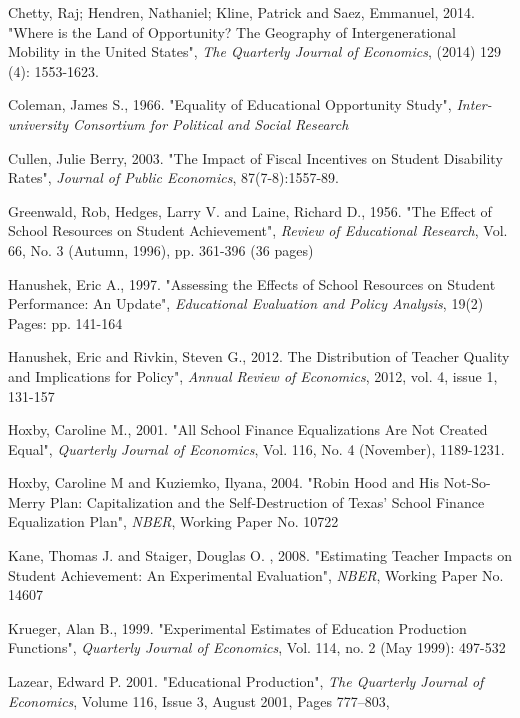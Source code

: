 \documentclass[11pt]{article}
\begin{document}
\begin{thebibliography}{9}

Chetty, Raj; Hendren, Nathaniel;  Kline, Patrick and Saez, Emmanuel, 2014.
"Where is the Land of Opportunity? The Geography of Intergenerational Mobility in the United States",
\textit{The Quarterly Journal of Economics}, (2014) 129 (4): 1553-1623. 

Coleman, James S., 1966.
"Equality of Educational Opportunity Study",
\textit{Inter-university Consortium for Political and Social Research}

Cullen, Julie Berry, 2003. 
"The Impact of Fiscal Incentives on Student Disability Rates", 
\textit{Journal of Public Economics}, 87(7-8):1557-89.

Greenwald, Rob, Hedges, Larry V.  and Laine, Richard D., 1956.
"The Effect of School Resources on Student Achievement",
\textit{Review of Educational Research}, Vol. 66, No. 3 (Autumn, 1996), pp. 361-396 (36 pages)

Hanushek, Eric A., 1997.
"Assessing the Effects of School Resources on Student Performance: An Update",
\textit{Educational Evaluation and Policy Analysis}, 19(2) Pages: pp. 141-164

Hanushek, Eric and  Rivkin, Steven G., 2012.
The Distribution of Teacher Quality and Implications for Policy",
\textit{Annual Review of Economics}, 2012, vol. 4, issue 1, 131-157

 Hoxby, Caroline M., 2001.
"All School Finance Equalizations Are Not Created Equal",
\textit{Quarterly Journal of Economics}, Vol. 116, No. 4 (November), 1189-1231.

 Hoxby, Caroline M and Kuziemko, Ilyana, 2004.
"Robin Hood and His Not-So-Merry Plan: Capitalization and the Self-Destruction of Texas' School Finance Equalization Plan",
\textit{NBER}, Working Paper No. 10722

Kane, Thomas J. and Staiger, Douglas O. , 2008.
"Estimating Teacher Impacts on Student Achievement: An Experimental Evaluation",
\textit{NBER}, Working Paper No. 14607

Krueger, Alan B., 1999.
"Experimental Estimates of Education Production Functions",
\textit{Quarterly Journal of Economics}, Vol. 114, no. 2 (May 1999): 497-532

Lazear, Edward P. 2001.
"Educational Production",
\textit{The Quarterly Journal of Economics}, Volume 116, Issue 3, August 2001, Pages 777–803,


\end{thebibliography}
\end{document}
